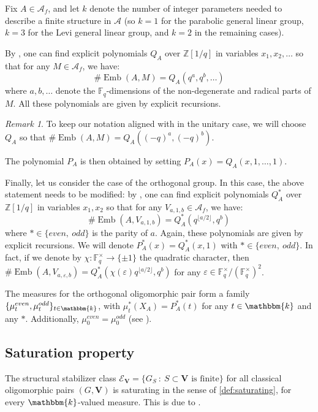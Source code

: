 \documentclass[11pt,a4paper]{amsart}
\theoremstyle{plain}%
\theoremstyle{definition}
\theoremstyle{remark}
\newtheorem{remark}[lemma]{Remark}
\newcommand{\eps}{\varepsilon}
\newcommand{\Z}{{\mathbb Z}}
\newcommand{\V}{\mathbf{V}}
\newcommand{\F}{{\mathbb F}}
\newcommand{\kk}{\mathbbm{k}}
\newcommand{\Emb}{\operatorname{Emb}}
\begin{document}
Fix $A\in \mathcal{A}_f$, and let $k$ denote the number of integer parameters needed to describe a finite structure in $\mathcal{A}$ (so $k=1$ for the parabolic general linear group, $k=3$ for the Levi general linear group, and $k=2$ in the remaining cases). 

By \cite{HS-classical}, one can find explicit polynomials $Q_A$ over $\Z[1/q]$ in variables $x_1, x_2, \ldots$ so that for any $M\in  \mathcal{A}_f$, we have: $$\#\Emb(A,M)=Q_A(q^a, q^b, \ldots)$$ where $a,b,\ldots$ denote the $\F_q$-dimensions of the non-degenerate and radical parts of $M$. All these polynomials are given by explicit recursions. 
\begin{remark}
    To keep our notation aligned with \cite{HS-classical} in the unitary case, we will choose $Q_A$ so that $\#\Emb(A,M)=Q_A((-q)^a, (-q)^b)$. 
\end{remark}

The polynomial $P_A$ is then obtained by setting $P_A(x)= Q_A(x, 1, \ldots, 1).$
\medskip

Finally, let us consider the case of the orthogonal group. In this case, the above statement needs to be modified: by \cite[§9]{HS-classical}, one can find explicit polynomials $Q^*_A$ over $\Z[1/q]$ in variables $x_1, x_2$ so that for any $V_{a,1,b}\in  \mathcal{A}_f$, we have: $$\#\Emb(A,V_{a,1,b})=Q_A^*({q^{\lfloor a/2\rfloor}}, q^b)$$ where $* \in \{even, ~odd\}$ is the parity of $a$. Again, these polynomials are given by explicit recursions. We will denote $P_A^*(x)=Q_A^*(x, 1)$ with $* \in \{even, ~odd\}$. In fact, if we denote by $\chi: \F_q^{\times} \to \{\pm 1\}$ the quadratic character, then $ \#\Emb(A,V_{a,\eps,b})=Q_A^*({\chi(\eps)q^{\lfloor a/2\rfloor}, q^b})$ for any $\eps\in {\F_q^{\times}/(\F_q^{\times})^2}$.

The measures for the orthogonal oligomorphic pair form a family $\{\mu^{even}_t, \mu^{odd}_t\}_{t\in \kk}$, with $\mu^*_t(X_A)=P_A^*(t)$ for any $t\in \kk$ and any $*$. Additionally, $\mu^{even}_0=\mu^{odd}_0$ (see \cite[§9.6]{HS-classical}). 

\subsection{Saturation property}\label{ssec:saturation}
The structural stabilizer class $ \mathcal{E}_{\V}=\{G_S~:~S\subset {\V} \text{ is finite} \}$ for all classical oligomorphic pairs $(G, \V)$ is saturating in the sense of \cref{def:saturating}, for every
$\kk$-valued measure. This is due to \cite[Proposition~15.2]{HS-oligomorphic} \cite[Propositions~6.8, 8.8, 9.10, and the paragraph
immediately preceding Corollary~10.10]{HS-classical}.
\end{document}
